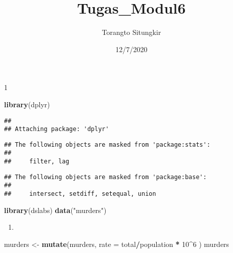 \documentclass[
]{article}
\title{Tugas\_Modul6}
\author{Torangto Situngkir}
\date{12/7/2020}
\newenvironment{Shaded}{\begin{snugshade}}{\end{snugshade}}
\newcommand{\DataTypeTok}[1]{\textcolor[rgb]{0.13,0.29,0.53}{#1}}
\newcommand{\DecValTok}[1]{\textcolor[rgb]{0.00,0.00,0.81}{#1}}
\newcommand{\KeywordTok}[1]{\textcolor[rgb]{0.13,0.29,0.53}{\textbf{#1}}}
\newcommand{\NormalTok}[1]{#1}
\newcommand{\OperatorTok}[1]{\textcolor[rgb]{0.81,0.36,0.00}{\textbf{#1}}}
\newcommand{\StringTok}[1]{\textcolor[rgb]{0.31,0.60,0.02}{#1}}
\begin{document}
\maketitle

1

\begin{Shaded}
\begin{Highlighting}[]
\KeywordTok{library}\NormalTok{(dplyr)}
\end{Highlighting}
\end{Shaded}

\begin{verbatim}
## 
## Attaching package: 'dplyr'
\end{verbatim}

\begin{verbatim}
## The following objects are masked from 'package:stats':
## 
##     filter, lag
\end{verbatim}

\begin{verbatim}
## The following objects are masked from 'package:base':
## 
##     intersect, setdiff, setequal, union
\end{verbatim}

\begin{Shaded}
\begin{Highlighting}[]
\KeywordTok{library}\NormalTok{(dslabs)}
\KeywordTok{data}\NormalTok{(}\StringTok{"murders"}\NormalTok{)}
\end{Highlighting}
\end{Shaded}

\begin{enumerate}
\def\labelenumi{\arabic{enumi}.}
\item
\end{enumerate}

\begin{Shaded}
\begin{Highlighting}[]
\NormalTok{murders <-}\StringTok{ }\KeywordTok{mutate}\NormalTok{(murders, }\DataTypeTok{rate =}\NormalTok{ total}\OperatorTok{/}\NormalTok{population }\OperatorTok{*}\StringTok{ }\DecValTok{10}\OperatorTok{^}\DecValTok{6}\NormalTok{ )}
\NormalTok{murders}
\end{Highlighting}
\end{Shaded}
\end{document}
